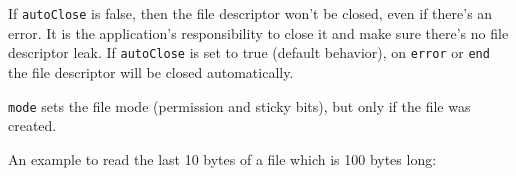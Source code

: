 \begin{Shaded}
\begin{Highlighting}[]
 \OperatorTok{;}

\OperatorTok{=} \NormalTok{(}\NormalTok{)}\OperatorTok{;}
\NormalTok{(() }\KeywordTok{=\textgreater{}}\NormalTok{ \{}
\NormalTok{()}\OperatorTok{;} 
\NormalTok{(}\NormalTok{)}\OperatorTok{;}
\NormalTok{(}\NormalTok{)}\OperatorTok{;}
\NormalTok{\}}\OperatorTok{,} \NormalTok{)}\OperatorTok{;}
\end{Highlighting}
\end{Shaded}

If \texttt{autoClose} is false, then the file descriptor won't be
closed, even if there's an error. It is the application's responsibility
to close it and make sure there's no file descriptor leak. If
\texttt{autoClose} is set to true (default behavior), on
\texttt{\textquotesingle{}error\textquotesingle{}} or
\texttt{\textquotesingle{}end\textquotesingle{}} the file descriptor
will be closed automatically.

\texttt{mode} sets the file mode (permission and sticky bits), but only
if the file was created.

An example to read the last 10 bytes of a file which is 100 bytes long:

\begin{Shaded}
\begin{Highlighting}[]
 \OperatorTok{;}

\NormalTok{(}\OperatorTok{,}\NormalTok{ \{ }\OperatorTok{:} \OperatorTok{,} \OperatorTok{:} \NormalTok{ \})}\OperatorTok{;}
\end{Highlighting}
\end{Shaded}

